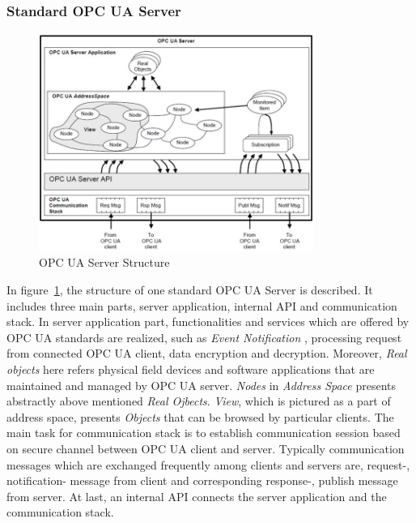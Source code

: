 \documentclass[]{llncs}
\begin{document}
\subsubsection{Standard OPC UA Server}
\begin{figure}[!htbp]
	\centering
	\includegraphics[width=0.8\textwidth]{server.jpg}
		\caption[ ]{OPC UA Server Structure\cite{O1}}
	\label{fig:server}
\end{figure}
In figure~\ref{fig:server}, the structure of one standard OPC UA Server is described. It includes three main parts, server application, internal API and communication stack. In server application part,  functionalities and services which are offered by OPC UA standards are realized, such as \emph{Event Notification} , processing request from connected OPC UA client, data encryption and decryption. Moreover, \emph{Real objects}  here  refers physical field devices and software applications that are maintained and managed by OPC UA server. \emph{Nodes} in \emph{Address Space} presents  abstractly above mentioned \emph{Real Ojbects}. \emph{View}, which is pictured as a part of address space, presents \emph{Objects} that can be browsed by particular clients. The main  task for communication stack  is to establish communication session based on secure channel between OPC UA client and server. Typically communication messages which are exchanged frequently among clients and servers are, request-, notification- message from client and   corresponding   response-, publish message from server. At last, an internal API connects the server application and the communication stack.
\end{document}
